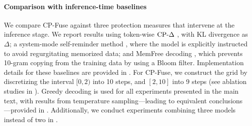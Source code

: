 \paragraph{Comparison with inference-time baselines} 
We compare CP-Fuse against three protection measures that intervene at the inference stage. We report results using token-wise $\text{CP-}\Delta$ \citep{vyas2023provable}, with KL divergence as $\Delta$; a system-mode self-reminder method \citep{xie2023defending}, where the model is explicitly instructed to avoid regurgitating memorized data; and MemFree decoding \citep{ippolito2023preventing}, which prevents 10-gram copying from the training data by using a Bloom filter. Implementation details for these baselines are provided in . For CP-Fuse, we construct the grid by discretizing the interval $[0, 2)$ into 10 steps, and $[2, 10]$ into 9 steps (see ablation studies in ). Greedy decoding is used for all experiments presented in the main text, with results from temperature sampling—leading to equivalent conclusions—provided in . Additionally, we conduct experiments combining three models instead of two in .

